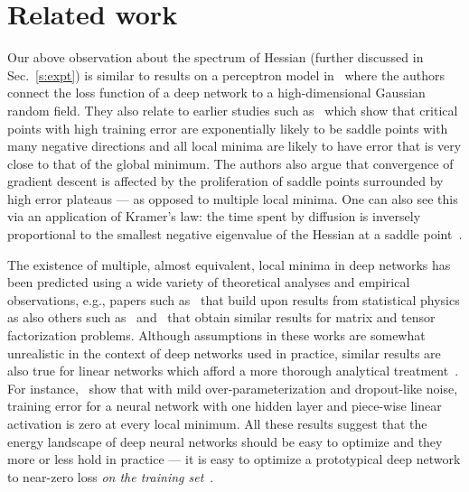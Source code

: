 \documentclass[10pt]{article}
\begin{document}
\section{Related work}
\label{s:prior_work}

Our above observation about the spectrum of Hessian (further discussed in Sec.~\ref{s:expt}) is similar to results on a perceptron model in~\citet{dauphin2014identifying} where the authors connect the loss function of a deep network to a high-dimensional Gaussian random field. They also relate to earlier studies such as~\citet{Baldi:1989:NNP:70359.70362,Fyodorov2007,Bray2007} which show that critical points with high training error are exponentially likely to be saddle points with many negative directions and all local minima are likely to have error that is very close to that of the global minimum. The authors also argue that convergence of gradient descent is affected by the proliferation of saddle points surrounded by high error plateaus --- as opposed to multiple local minima. One can also see this via an application of Kramer's law: the time spent by diffusion is inversely proportional to the smallest negative eigenvalue of the Hessian at a saddle point~\citep{bovier2006metastability}.

The existence of multiple, almost equivalent, local minima in deep networks has been predicted using a wide variety of theoretical analyses and empirical observations, e.g., papers such as~\citet{spinglass2015,DBLP:conf/colt/ChoromanskaLA15,chaudhari2015trivializing,sagun2014explorations} that build upon results from statistical physics as also others such as~\citet{haeffele2015global} and~\citet{janzamin2015beating} that obtain similar results for matrix and tensor factorization problems. Although assumptions in these works are somewhat unrealistic in the context of deep networks used in practice, similar results are also true for linear networks which afford a more thorough analytical treatment~\citep{DBLP:journals/corr/SaxeMG13}. For instance,~\citet{soudry2016no} show that with mild over-parameterization and dropout-like noise, training error for a neural network with one hidden layer and piece-wise linear activation is zero at every local minimum. All these results suggest that the energy landscape of deep neural networks should be easy to optimize and they more or less hold in practice --- it is easy to optimize a prototypical deep network to near-zero loss \emph{on the training set}~\citep{hardt2015train,DBLP:journals/corr/GoodfellowV14}.  
\end{document}
